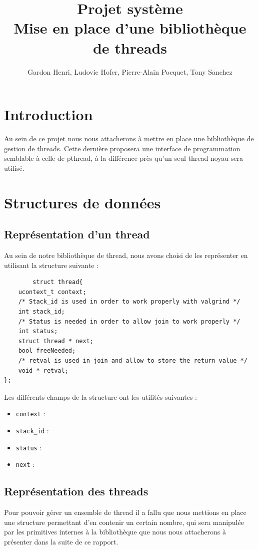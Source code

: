 \documentclass{article}
\title{Projet système \\ Mise en place d'une bibliothèque de threads}
\author{Gardon Henri, Ludovic Hofer, Pierre-Alain Pocquet, Tony
  Sanchez}
\begin{document}
	\maketitle
	\newpage
	\tableofcontents
	\newpage

	\section{Introduction}
	
	Au sein de ce projet nous nous attacherons à mettre en place une
    bibliothèque de gestion de threads. Cette dernière proposera une
    interface de programmation semblable à celle de pthread, à la
    différence près qu'un seul thread noyau sera utilisé.

	\section{Structures de données}

		\subsection{Représentation d'un thread}
		Au sein de notre bibliothèque de thread, nous avons choisi de les
		représenter en utilisant la structure suivante : \\
		\begin{verbatim}
		struct thread{
    ucontext_t context;
    /* Stack_id is used in order to work properly with valgrind */
    int stack_id;
    /* Status is needed in order to allow join to work properly */
    int status;
    struct thread * next;
    bool freeNeeded;
    /* retval is used in join and allow to store the return value */
    void * retval;
};
	\end{verbatim}
		Les différents champs de la structure ont les utilités 
		suivantes :
		\begin{itemize}
			\item \verb!context! :
			\item \verb!stack_id! :
			\item \verb!status! :
			\item \verb!next! : %
			
		\end{itemize}		
		

		\subsection{Représentation des threads}
		Pour pouvoir gérer un ensemble de thread il a fallu que nous
        mettions en place une structure permettant d'en contenir un
        certain nombre, qui sera manipulée par les primitives internes
        à la bibliothèque que nous nous attacherons à présenter dans
        la suite de ce rapport.
\end{document}
